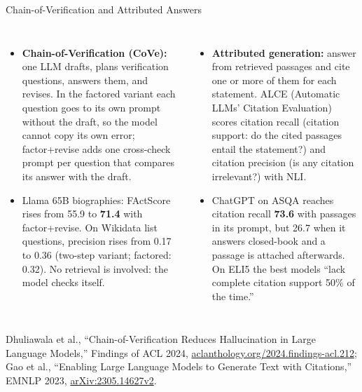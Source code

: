 \begin{frame}{Chain-of-Verification and Attributed Answers}
\begin{columns}[T,onlytextwidth]
      \begin{itemize}\scriptsize\itemsep0.3em
        \item[\textcolor{red}{$\blacktriangleright$}] \textbf{Chain-of-Verification (CoVe):} one LLM drafts, plans verification questions, answers them, and revises. In the factored variant each question goes to its own prompt without the draft, so the model cannot copy its own error; factor+revise adds one cross-check prompt per question that compares its answer with the draft.
        \item[\textcolor{red}{$\blacktriangleright$}] Llama 65B biographies: FActScore rises from 55.9 to \textbf{71.4} with factor+revise. On Wikidata list questions, precision rises from 0.17 to 0.36 (two-step variant; factored: 0.32). No retrieval is involved: the model checks itself.
      \end{itemize}
      \begin{itemize}\scriptsize\itemsep0.3em
        \item[\textcolor{red}{$\blacktriangleright$}] \textbf{Attributed generation:} answer from retrieved passages and cite one or more of them for each statement. ALCE (Automatic LLMs' Citation Evaluation) scores citation recall (citation support: do the cited passages entail the statement?) and citation precision (is any citation irrelevant?) with NLI.
        \item[\textcolor{red}{$\blacktriangleright$}] ChatGPT on ASQA reaches citation recall \textbf{73.6} with passages in its prompt, but 26.7 when it answers closed-book and a passage is attached afterwards. On ELI5 the best models ``lack complete citation support 50\% of the time.''
      \end{itemize}
  \end{columns}
  \vspace{0.1em}
  {\scriptsize Dhuliawala et al., ``Chain-of-Verification Reduces Hallucination in Large Language Models,'' Findings of ACL 2024, \href{https://aclanthology.org/2024.findings-acl.212/}{aclanthology.org/2024.findings-acl.212}; Gao et al., ``Enabling Large Language Models to Generate Text with Citations,'' EMNLP 2023, \href{https://arxiv.org/abs/2305.14627v2}{arXiv:2305.14627v2}.\par}
\end{frame}

